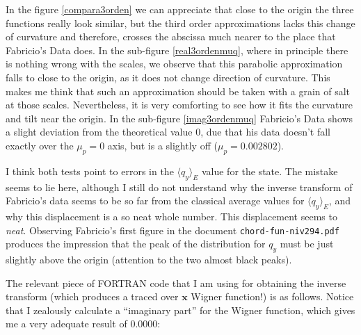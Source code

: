 \documentclass[a4paper,12pt]{article}
\newcommand{\xfase}{\mathbf{x}}
\newcommand{\Prom}[2]{\langle #1\rangle_{#2}}
\begin{document}
In the figure \ref{compara3orden} we can appreciate that close to the origin the
three functions really look similar, but the third order approximations lacks
this change of curvature and therefore, crosses the abscissa much nearer
to the place that Fabricio's Data does. In the sub-figure \ref{real3ordenmuq},
where in principle there is nothing wrong with the scales, we observe that
this parabolic approximation falls to close to the origin, as it does not
change direction of curvature. This makes me think that such an approximation
should be taken with a grain of salt at those scales. Nevertheless, it is very
comforting to see how it fits the curvature and tilt near the origin. 
In the sub-figure \ref{imag3ordenmuq} Fabricio's Data shows a slight deviation
from the theoretical value $0$, due that his data doesn't fall exactly over the
$\mu_p=0$ axis, but is a slightly off ($\mu_p =0.002802$).  

I think both tests point to errors in the $\Prom{q_y}{E}$ value for the state.
The mistake seems to lie here, although I still do not understand why the inverse
transform of Fabricio's data seems to be so far from the classical 
average values for $\Prom{q_y}{E}$, and why this displacement is
a so neat whole number. This displacement seems to \emph{neat}. Observing Fabricio's
first figure in the document \verb|chord-fun-niv294.pdf| produces
the impression that the peak of the distribution for $q_y$ must be just slightly above
the origin (attention to the two almost black peaks). 

The relevant piece of FORTRAN code that I am using for obtaining the inverse transform 
(which produces a traced over $\xfase$ Wigner function!) is as follows. Notice that
I zealously calculate a ``imaginary part'' for the Wigner function, which
gives me a very adequate result of $0.0000$:
\end{document}
